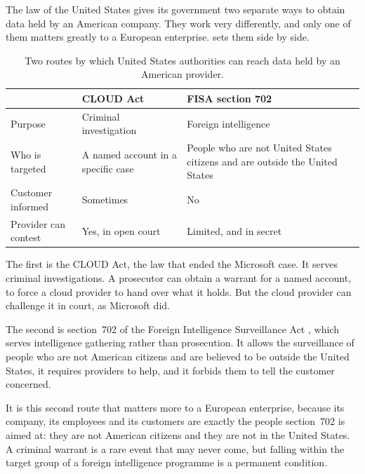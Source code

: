 The law of the United States gives its government two separate ways to obtain data
held by an American company. They work very differently, and only one of them
matters greatly to a European enterprise.  sets them side by
side.

\begin{table}[htbp]
  \centering
  \caption{Two routes by which United States authorities can reach data held by
           an American provider.}
  \label{tab:us-powers}
  \small
  \begin{tabularx}{\textwidth}{@{}l X X@{}}
    \toprule
    & \textbf{\acs{CLOUD Act}} & \textbf{FISA section 702} \\
    \midrule
    Purpose          & Criminal investigation & Foreign intelligence \\[0.35em]
    Who is targeted  & A named account in a specific case
                     & People who are not United States citizens and are
                       outside the United States \\[0.35em]
    Customer informed & Sometimes & No \\[0.35em]
    Provider can contest & Yes, in open court & Limited, and in secret \\
    \bottomrule
  \end{tabularx}
\end{table}

The first is the \ac{CLOUD Act}, the law that ended the Microsoft case. It serves
criminal investigations. A prosecutor can obtain a warrant for a named account, to
force a cloud provider to hand over what it holds. But the cloud provider can
challenge it in court, as Microsoft did.

The second is section~702 of the Foreign Intelligence Surveillance Act
\cite{FISA702}, which serves intelligence gathering rather than prosecution. It
allows the surveillance of people who are not American citizens and are believed
to be outside the United States, it requires providers to help, and it forbids
them to tell the customer concerned.

It is this second route that matters more to a European enterprise, because its
company, its employees and its customers are exactly the people section~702 is
aimed at: they are not American citizens and they are not in the United States. A
criminal warrant is a rare event that may never come, but falling within the
target group of a foreign intelligence programme is a permanent condition.

